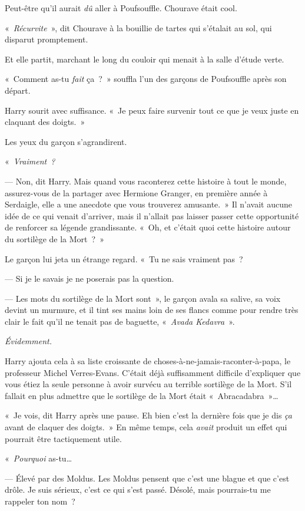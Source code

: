 Peut-être qu'il aurait \emph{dû} aller à Poufsouffle.
Chourave était cool.

«~\emph{Récurvite}~», dit Chourave à la bouillie de tartes qui s'étalait au sol, qui disparut promptement.

Et elle partit, marchant le long du couloir qui menait à la salle d'étude verte.

«~Comment as-tu \emph{fait} ça~?~» souffla l'un des garçons de Poufsouffle après son départ.

Harry sourit avec suffisance.
«~Je peux faire survenir tout ce que je veux juste en claquant des doigts.~»

Les yeux du garçon s'agrandirent.

«~\emph{Vraiment~?}

--- Non, dit Harry. Mais quand vous raconterez cette histoire à tout le monde, assurez-vous de la partager avec Hermione Granger, en première année à Serdaigle, elle a une anecdote que vous trouverez amusante.~»
Il n'avait aucune idée de ce qui venait d'arriver, mais il n'allait pas laisser passer cette opportunité de renforcer sa légende grandissante.
«~Oh, et c'était quoi cette histoire autour du sortilège de la Mort~?~»

Le garçon lui jeta un étrange regard.
«~Tu ne sais vraiment pas~?

--- Si je le savais je ne poserais pas la question.

--- Les mots du sortilège de la Mort sont~», le garçon avala sa salive, sa voix devint un murmure, et il tint ses mains loin de ses flancs comme pour rendre très clair le fait qu'il ne tenait pas de baguette, «~\emph{Avada Kedavra}~».

\emph{Évidemment.}

Harry ajouta cela à sa liste croissante de choses-à-ne-jamais-raconter-à-papa, le professeur Michel Verres-Evans.
C'était déjà suffisamment difficile d'expliquer que vous étiez la seule personne à avoir survécu au terrible sortilège de la Mort.
S'il fallait en plus admettre que le sortilège de la Mort était «~Abracadabra~»…

«~Je vois, dit Harry après une pause.
Eh bien c'est la dernière fois que je dis \emph{ça} avant de claquer des doigts.~»
En même temps, cela \emph{avait} produit un effet qui pourrait être tactiquement utile.

«~\emph{Pourquoi} as-tu…

--- Élevé par des Moldus.
Les Moldus pensent que c'est une blague et que c'est drôle.
Je suis sérieux, c'est ce qui s'est passé.
Désolé, mais pourrais-tu me rappeler ton nom~?

